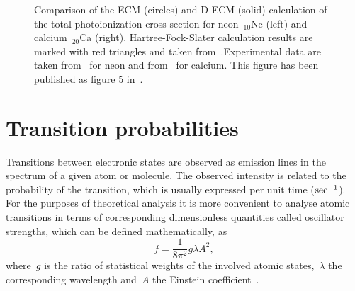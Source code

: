 \begin{figure}
	\centering  
	\caption{Comparison of the ECM (circles)
		and D-ECM (solid) calculation of the total
		photoionization cross-section for neon~$_{10}$Ne (left)
			and calcium~$_{20}$Ca (right). Hartree-Fock-Slater calculation
		results are marked with red triangles and taken from~\cite{YEH19851}.Experimental data are taken
			from~\cite{MARR1976497} for neon and from~\cite{L_rch_1999} for calcium. This figure has been published as figure 5 in~\cite{Dzikowski_2021}.}
	\label{fig:PIC}
\end{figure}

\section{Transition probabilities}
\label{sec:TP}

Transitions between electronic states are observed as emission lines in the spectrum of a given atom or molecule. The observed intensity is related to the probability of the transition, which is usually expressed per unit time ($\rm{sec}^{-1}$). For the purposes of theoretical analysis it is more convenient to analyse atomic transitions in terms of corresponding dimensionless quantities called oscillator strengths, which can be defined mathematically, as~\cite{OscillatorsDefinition}
\begin{equation}
    f = \frac{1}{8 \pi^2} g \lambda A^2,
\end{equation}
where~$g$ is the ratio of statistical weights of the involved atomic states,~$\lambda$ the corresponding wavelength and~$A$ the Einstein coefficient~\cite{EinsteinCoeff}.

